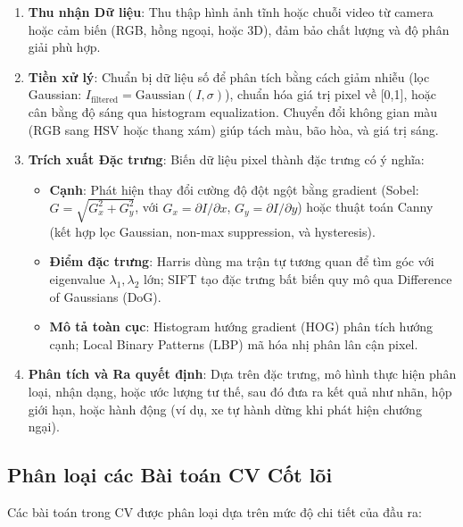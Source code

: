 \begin{enumerate}
    \item \textbf{Thu nhận Dữ liệu}: Thu thập hình ảnh tĩnh hoặc chuỗi video từ camera hoặc cảm biến (RGB, hồng ngoại, hoặc 3D), đảm bảo chất lượng và độ phân giải phù hợp.\autocite{szeliski2010}
    \item \textbf{Tiền xử lý}: Chuẩn bị dữ liệu số để phân tích bằng cách giảm nhiễu (lọc Gaussian: $I_{\text{filtered}} = \text{Gaussian}(I, \sigma)$), chuẩn hóa giá trị pixel về [0,1], hoặc cân bằng độ sáng qua histogram equalization. Chuyển đổi không gian màu (RGB sang HSV hoặc thang xám) giúp tách màu, bão hòa, và giá trị sáng.\autocite{szeliski2010}
    \item \textbf{Trích xuất Đặc trưng}: Biến dữ liệu pixel thành đặc trưng có ý nghĩa:
    \begin{itemize}
        \item \textbf{Cạnh}: Phát hiện thay đổi cường độ đột ngột bằng gradient (Sobel: $G = \sqrt{G_x^2 + G_y^2}$, với $G_x = \partial I / \partial x$, $G_y = \partial I / \partial y$) hoặc thuật toán Canny (kết hợp lọc Gaussian, non-max suppression, và hysteresis).\autocite{sobel1968,canny1986}
        \item \textbf{Điểm đặc trưng}: Harris dùng ma trận tự tương quan để tìm góc với eigenvalue $\lambda_1, \lambda_2$ lớn; SIFT tạo đặc trưng bất biến quy mô qua Difference of Gaussians (DoG).\autocite{lowe1999}
        \item \textbf{Mô tả toàn cục}: Histogram hướng gradient (HOG) phân tích hướng cạnh; Local Binary Patterns (LBP) mã hóa nhị phân lân cận pixel.\autocite{dalal2005}
    \end{itemize}
    \item \textbf{Phân tích và Ra quyết định}: Dựa trên đặc trưng, mô hình thực hiện phân loại, nhận dạng, hoặc ước lượng tư thế, sau đó đưa ra kết quả như nhãn, hộp giới hạn, hoặc hành động (ví dụ, xe tự hành dừng khi phát hiện chướng ngại).\autocite{horn1981}
\end{enumerate}

\subsection{Phân loại các Bài toán CV Cốt lõi}
Các bài toán trong CV được phân loại dựa trên mức độ chi tiết của đầu ra:

